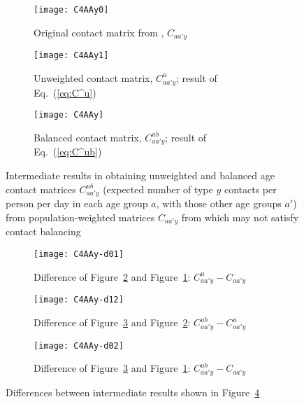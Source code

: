 \begin{figure}
  \setlength{\abovecaptionskip}{.5\smallskipamount}
  \setlength{\belowcaptionskip}{.5\smallskipamount}
  \begin{subfigure}{\linewidth}
    \texttt{[image: C4AAy0]}
    \caption{Original contact matrix from \cite{Prem2017}, $C_{aa'y}$}
    \label{fig:C4AAy0}
  \end{subfigure}
  \begin{subfigure}{\linewidth}
    \texttt{[image: C4AAy1]}
    \caption{Unweighted contact matrix, $C^u_{aa'y}$; result of Eq.~(\ref{eq:C^u})}
    \label{fig:C4AAy1}
  \end{subfigure}
  \begin{subfigure}{\linewidth}
    \texttt{[image: C4AAy]}
    \caption{Balanced contact matrix, $C^{ub}_{aa'y}$; result of Eq.~(\ref{eq:C^ub})}
    \label{fig:C4AAy2}
  \end{subfigure}
  \caption{Intermediate results in obtaining unweighted and balanced age contact matrices $C^{ub}_{aa'y}$
    (expected number of type $y$ contacts per person per day in each age group $a$, with those other age groups $a'$)
    from population-weighted matrices $C_{aa'y}$ from \cite{Prem2017} which may not satisfy contact balancing}
  \label{fig:C4AAyi}
\end{figure}
\begin{figure}
  \begin{subfigure}{\linewidth}
    \texttt{[image: C4AAy-d01]}
    \caption{Difference of Figure~\ref{fig:C4AAy1} and Figure~\ref{fig:C4AAy0}: $C^{u}_{aa'y} - C_{aa'y}$}
    \label{fig:C4AAyd01}
  \end{subfigure}
  \begin{subfigure}{\linewidth}
    \texttt{[image: C4AAy-d12]}
    \caption{Difference of Figure~\ref{fig:C4AAy2} and Figure~\ref{fig:C4AAy1}: $C^{ub}_{aa'y} - C^{u}_{aa'y}$}
    \label{fig:C4AAyd12}
  \end{subfigure}
  \begin{subfigure}{\linewidth}
    \texttt{[image: C4AAy-d02]}
    \caption{Difference of Figure~\ref{fig:C4AAy2} and Figure~\ref{fig:C4AAy0}: $C^{ub}_{aa'y} - C_{aa'y}$}
    \label{fig:C4AAyd02}
  \end{subfigure}
  \caption{Differences between intermediate results shown in Figure~\ref{fig:C4AAyi}}
  \label{fig:C4AAyd}
\end{figure}
